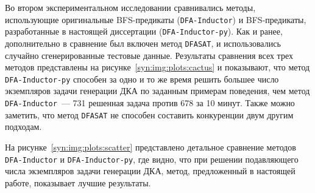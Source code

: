 Во втором экспериментальном исследовании сравнивались методы, использующие оригинальные BFS-предикаты (\texttt{DFA-Inductor}) и BFS-предикаты, разработанные в настоящей диссертации (\texttt{DFA-Inductor-py}).
Как и ранее, дополнительно в сравнение был включен метод \texttt{DFASAT}, и использовались случайно сгенерированные тестовые данные.
Результаты сравнения всех трех методов представлены на рисунке~\ref{syn:img:plots:cactus} и показывают, что метод \texttt{DFA-Inductor-py} способен за одно и то же время решить большее число экземпляров задачи генерации ДКА по заданным примерам поведения, чем метод \texttt{DFA-Inductor}~--- 731 решенная задача против 678 за 10 минут.
Также можно заметить, что метод \texttt{DFASAT} не способен составить конкуренции двум другим подходам.

На рисунке~\ref{syn:img:plots:scatter} представлено детальное сравнение методов \texttt{DFA-Inductor} и \texttt{DFA-Inductor-py}, где видно, что при решении подавляющего числа экземпляров задачи генерации ДКА, метод, предложенный в настоящей работе, показывает лучшие результаты.


